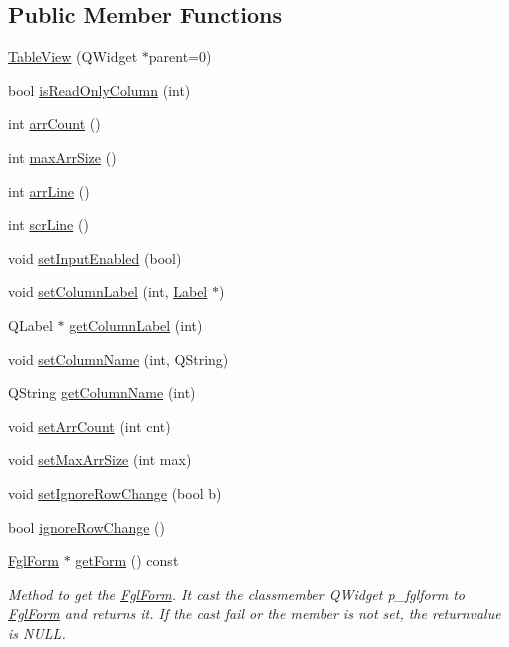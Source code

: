 \subsection*{Public Member Functions}
\begin{DoxyCompactItemize}
\item 
\hyperlink{classTableView_adb6530c7759567b474c3a3b7ba81855c}{TableView} (QWidget $\ast$parent=0)
\item 
bool \hyperlink{classTableView_a845c45c80748f79f3e81f7bf77e5261a}{isReadOnlyColumn} (int)
\item 
int \hyperlink{classTableView_a35187a10df2c76c9fe9099d17d9869cd}{arrCount} ()
\item 
int \hyperlink{classTableView_a2573035b04bb9582878096d501381e3b}{maxArrSize} ()
\item 
int \hyperlink{classTableView_a7ec1fcd1ab0302dde810332c72602273}{arrLine} ()
\item 
int \hyperlink{classTableView_aecb8d3ea59d572fb9a7df9a7ba798c20}{scrLine} ()
\item 
void \hyperlink{classTableView_ac80392b3e39df8bb876d5ac378375caf}{setInputEnabled} (bool)
\item 
void \hyperlink{classTableView_a5a86ed0c209382e0c31266952d3fafaf}{setColumnLabel} (int, \hyperlink{classLabel}{Label} $\ast$)
\item 
QLabel $\ast$ \hyperlink{classTableView_a22d025267d25ecfe7684c31edab75a2a}{getColumnLabel} (int)
\item 
void \hyperlink{classTableView_ac8f1f15e7ec4e97a15560d1c00ce7b02}{setColumnName} (int, QString)
\item 
QString \hyperlink{classTableView_af953c1328e203f9b0d380b9d5c6125ff}{getColumnName} (int)
\item 
void \hyperlink{classTableView_a2bd7391fdc86cdd2f57f40b220aacf9d}{setArrCount} (int cnt)
\item 
void \hyperlink{classTableView_a53b722124712ba16befce5b620a82a8f}{setMaxArrSize} (int max)
\item 
void \hyperlink{classTableView_a41a45f3b1b6fc2be38f7068629bd9462}{setIgnoreRowChange} (bool b)
\item 
bool \hyperlink{classTableView_a83872a716abf63ed862c2c4607dc4146}{ignoreRowChange} ()
\item 
\hyperlink{classFglForm}{FglForm} $\ast$ \hyperlink{classTableView_a0f9f4eeeac49765581dd86a3e97a5b4b}{getForm} () const 
\begin{DoxyCompactList}\small\item\em Method to get the \hyperlink{classFglForm}{FglForm}. It cast the classmember QWidget p\_\-fglform to \hyperlink{classFglForm}{FglForm} and returns it. If the cast fail or the member is not set, the returnvalue is NULL. \item\end{DoxyCompactList}\item 

\end{DoxyCompactItemize}
